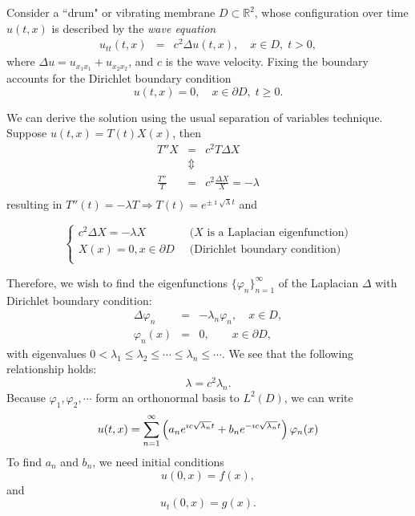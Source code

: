 Consider a ``drum" or vibrating membrane $D \subset \mathbb{R}^2$, whose configuration over time $u(t,x)$ is described by the {\em{wave equation}}
\begin{eqnarray*}
u_{tt}(t,x) &=&c^2\Delta u (t,x), \quad x\in D, \; t>0,
\end{eqnarray*}
where $\Delta u = u_{x_1x_1} + u_{x_2x_2}$, and $c$ is the wave velocity. Fixing the boundary accounts for the Dirichlet boundary condition
$$u(t,x) = 0, \quad x \in \partial D,\; t \geq 0.$$

We can derive the solution using the usual separation of variables technique.  Suppose $u(t,x) = T(t) X(x)$, then
\begin{eqnarray*}
T''X&=&c^2T\Delta X\\
&\Updownarrow&\\
\frac{T''}{T} &=& c^2\frac{\Delta X}{X} = -\lambda\\
\end{eqnarray*}
resulting in  $T''(t)=-\lambda T \Rightarrow T(t) = e^{\pm \imath \sqrt{\lambda}t}$ and

\begin{displaymath}
\left\{
     \begin{array}{lr}
       c^2\Delta X = -\lambda X  &\;\;\text{($X$ is a Laplacian eigenfunction)}\\
       X(x)=0 , x\in\partial D &\;\;\text{(Dirichlet boundary condition)}\\
     \end{array}
   \right.
\end{displaymath}

Therefore, we wish to find the eigenfunctions $\lbrace\varphi_n\rbrace_{n=1}^\infty$ of the Laplacian $\Delta$ with Dirichlet boundary condition:
\begin{eqnarray*}
       \Delta \varphi_n &=& -\lambda_n \varphi_n,\quad x\in D,\\
       \varphi_n(x)&=&0, \quad \quad x\in\partial D,
\end{eqnarray*}
with eigenvalues $0 < \lambda_1 \leq \lambda_2 \leq \cdots \leq \lambda_n \leq \cdots$. We see that the following relationship holds: $$\lambda = c^2\lambda_n.$$
Because $\varphi_1, \varphi_2, \cdots$ form an orthonormal basis to $L^2(D)$, we can write
\begin{equation*}
u(t,x)=\sum_{n=1}^\infty \left( a_n e^{\imath c\sqrt{\lambda_n} t} + b_n e^{-\imath c \sqrt{\lambda_n} t}\right) \varphi_n(x)\\
\end{equation*}
To find $a_n$ and $b_n$, we need initial conditions $$u(0,x)=f(x),$$ and $$u_t(0,x)=g(x).$$

